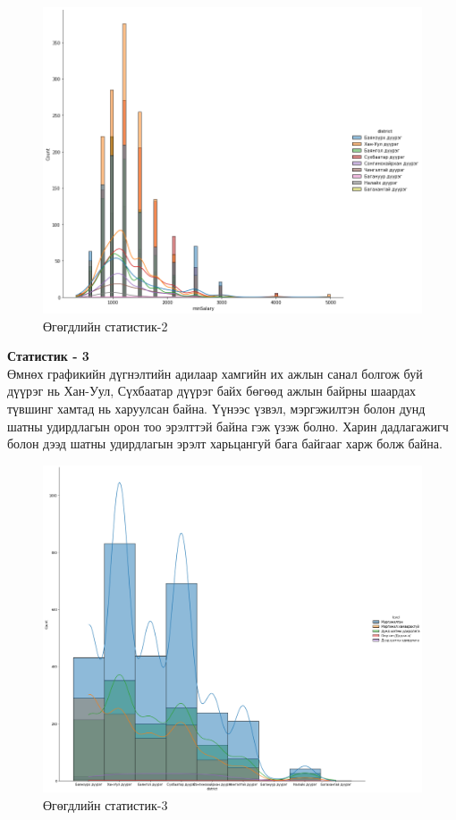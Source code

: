 \begin{figure}[ht]
  \centering
  \includegraphics[width=\textwidth]{graphics/3.png}
  \caption{Өгөгдлийн статистик-2}\label{fig:statistics2}
\end{figure}
\newpage
\textbf{Статистик - 3}
\\Өмнөх графикийн дүгнэлтийн адилаар хамгийн их ажлын санал болгож буй дүүрэг нь Хан-Уул, Сүхбаатар дүүрэг байх бөгөөд ажлын байрны шаардах түвшинг хамтад нь харуулсан байна. Үүнээс үзвэл, мэргэжилтэн болон дунд шатны удирдлагын орон тоо эрэлттэй байна гэж үзэж болно. Харин дадлагажигч болон дээд шатны удирдлагын эрэлт харьцангуй бага байгааг харж болж байна.
\begin{figure}[ht]
  \centering
  \includegraphics[width=\textwidth]{graphics/4.png}
  \caption{Өгөгдлийн статистик-3}
  \label{fig:statistics3}
\end{figure}
